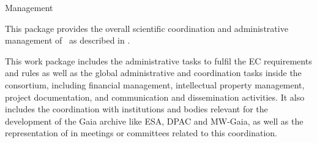 
\begin{workpackage}{Management}
  \label{wp:management} %

  \wpend{\duration} %


  \makewptable %

  \begin{wpobjectives}
    This package provides the overall scientific coordination and administrative management of \acro\ as described in .
  \end{wpobjectives}

  \begin{wpdescription}

    This work package includes the administrative tasks to fulfil the EC requirements and rules as well as the global administrative and coordination tasks inside the consortium, including financial management, intellectual property management, project documentation, and communication and dissemination activities. It also includes the coordination with institutions and bodies relevant for the development of the Gaia archive like ESA, DPAC and MW-Gaia, as well as the representation of {\acro} in meetings or committees related to this coordination.

\end{wpdescription}
\end{workpackage}
